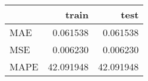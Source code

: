 \begin{tabular}{lrr}
\toprule
{} &      train &       test \\
\midrule
MAE  &   0.061538 &   0.061538 \\
MSE  &   0.006230 &   0.006230 \\
MAPE &  42.091948 &  42.091948 \\
\bottomrule
\end{tabular}
